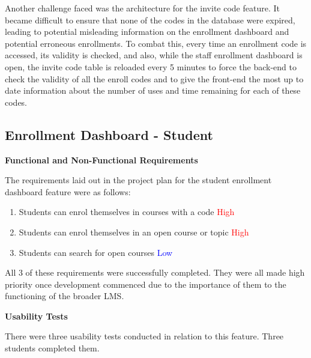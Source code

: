Another challenge faced was the architecture for the invite code feature. It became difficult to ensure that none of the codes in the database were expired, leading to potential misleading information on the enrollment dashboard and potential erroneous enrollments. To combat this, every time an enrollment code is accessed, its validity is checked, and also, while the staff enrollment dashboard is open, the invite code table is reloaded every 5 minutes to force the back-end to check the validity of all the enroll codes and to give the front-end the most up to date information about the number of uses and time remaining for each of these codes.

\subsection{Enrollment Dashboard - Student}
\textbf{Functional and Non-Functional Requirements}

The requirements laid out in the project plan for the student enrollment dashboard feature were as follows:
    \begin{enumerate}
    \item Students can enrol themselves in courses with a code \textcolor{Red}{High}
    \item Students can enrol themselves in an open course or topic \textcolor{Red}{High}
    \item Students can search for open courses \textcolor{Blue}{Low}
    \end{enumerate}
All 3 of these requirements were successfully completed. They were all made high priority once development commenced due to the importance of them to the functioning of the broader LMS.

\textbf{Usability Tests}

There were three usability tests conducted in relation to this feature. Three students completed them.


